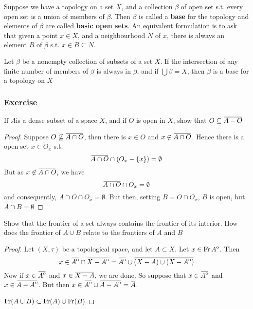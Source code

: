 \documentclass[11pt]{article}
\begin{document}
Suppose we have a topology on a set \(X\), and a collection \(\beta\) of open set
s.t. every open set is a union of members of \(\beta\). Then \(\beta\) is called a
\textbf{base} for the topology and elements of \(\beta\) are called \textbf{basic open sets}.
An equivalent formulation is to ask that given a point \(x\in X\), and a
neighbourhood \(N\) of \(x\), there is always an element \(B\) of \(\beta\) s.t.
\(x\in B\subseteq N\).

\begin{theorem}[]
Let \(\beta\) be a nonempty collection of subsets of a set \(X\). If the
intersection of any finite number of members of \(\beta\) is always in \(\beta\), and
if \(\bigcup\beta=X\), then \(\beta\) is a base for a topology on \(X\)
\end{theorem}

\subsubsection{Exercise}
\label{sec:org58c3a79}
\begin{exercise}
\label{ex2.1.5}
If \(A\)is a dense subset of a space \(X\), and if \(O\) is open in \(X\),
show that \(O\subseteq\bbar{A-O}\)
\end{exercise}

\begin{proof}
Suppose \(O\not\subseteq\bbar{A\cap O}\), then there is \(x\in O\) and
\(x\not\in\bbar{A\cap O}\). Hence there is a open set \(x\in O_x\) s.t.
\begin{equation*}
\bbar{A\cap O}\cap(O_x-\{x\})=\emptyset
\end{equation*}
But as \(x\not\in\bbar{A\cap O}\), we have
\begin{equation*}
\bbar{A\cap O}\cap O_x=\emptyset
\end{equation*}
and consequently, \(A\cap O\cap O_x=\emptyset\). But then, setting \(B=O\cap
    O_x\), \(B\) is open, but \(A\cap B=\emptyset\)
\end{proof}

\begin{exercise}
\label{ex2.1.10}
Show that the frontier of a set always contains the frontier of its
interior. How does the frontier of \(A\cup B\) relate to the frontiers of
\(A\) and \(B\)
\end{exercise}

\begin{proof}
Let \((X,\tau)\) be a topological space, and let \(A\subset X\). Let
\(x\in\operatorname{Fr}{\kern0ptA}^{\mathrm{o}}\). Then
\begin{equation*}
x\in\bbar{\interior{A}}\cap\bbar{X-\interior{A}}=
\bbar{\interior{A}}\cup\bbar{(X-A)\cup(X-\interior{A})}
\end{equation*}
Now if \(x\in\bbar{\interior{A}}\) and \(x\in\bbar{X-A}\), we are done.
So suppose that \(x\in\bbar{\interior{A}}\) and
\(x\in\bbar{A-\interior{A}}\). But then
\(x\in\bbar{\interior{A}}\cup\bbar{A-\interior{A}}=\bbar{A}\).

\(\operatorname{Fr}(A\cup B)\subset\operatorname{Fr}(A)\cup\operatorname{Fr}(B)\)
\end{proof}
\end{document}
